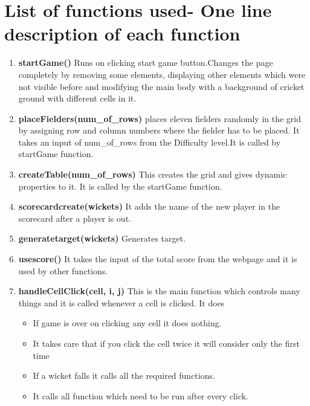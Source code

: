 \documentclass{article}
\begin{document}
\section{List of functions used- One line description of each function}
\begin{enumerate}
    \item \textbf{startGame()} Runs on clicking start game button.Changes the page completely by removing some elements, displaying other elements which were not visible before and modifying the main body with a background of cricket ground with different cells in it.
    \item \textbf{placeFielders(num\_of\_rows)} places eleven fielders randomly in the grid by assigning row and column numbers where the fielder has to be placed. It takes an input of num\_of\_rows from the Difficulty level.It is called by startGame function.
    \item \textbf{createTable(num\_of\_rows)} This creates the grid and gives dynamic properties to it. It is called by the startGame function.
    \item \textbf{scorecardcreate(wickets)} It adds the name of the new player in the scorecard after a player is out.
    \item \textbf{generatetarget(wickets)} Generates target.
    \item \textbf{usescore()} It takes the input of the total score from the webpage and it is used by other functions.
    \item \textbf{handleCellClick(cell, i, j)} This is the main function which controls many things and it is called whenever a cell is clicked.
    It does
    \begin{itemize}
        \item If game is over on clicking any cell it does nothing.
        \item It takes care that if you click the cell twice it will consider only the first time
        \item If a wicket falls it calls all the required functions.
        \item It calls all function which need to be run after every click.
        

\end{itemize}
\end{enumerate}
\end{document}
